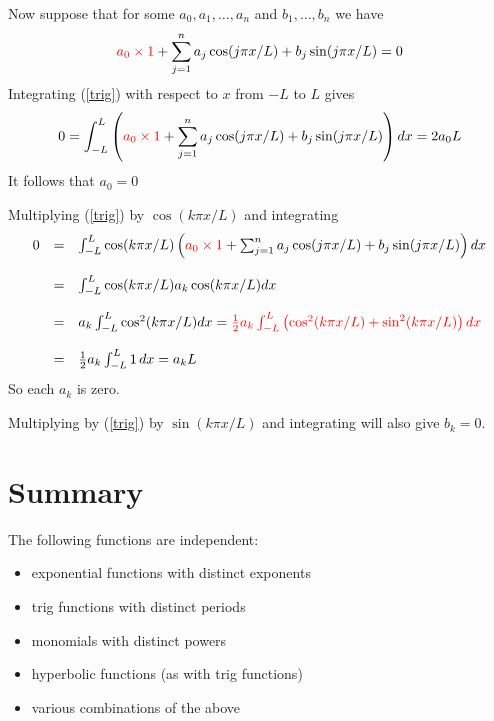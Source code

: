 \documentclass{article}
\begin{document}
Now suppose that for some $a_0, a_1, \ldots , a_n$ and $b_1, \dots , b_n$ we have
\begin{equation}
\label{trig}
\textcolor{red}{a_0 \times 1} + \sum_{j = 1}^n a_j \cos (j \pi x/L) + b_j \sin (j \pi x/L) = 0
\end{equation}
Integrating (\ref{trig}) with respect to $x$ from $-L$ to $L$ gives
$$
0 = \int_{-L}^L \left( \textcolor{red}{a_0 \times 1} + \sum_{j = 1}^n a_j \cos (j \pi x/L) + b_j \sin (j \pi x/L) \right) dx = 2 a_0 L
$$
It follows that $a_0 = 0$


Multiplying (\ref{trig}) by $\cos (k \pi x/L)$ and integrating
{\small
$$
\begin{array}{lll}
0 & = & \int_{-L}^L \cos (k \pi x/L) \left( \textcolor{red}{a_0 \times 1} + \sum_{j = 1}^n a_j \cos (j \pi x/L) + b_j \sin (j \pi x/L) \right) dx\\
\\
& = & \int_{-L}^L \cos (k \pi x/L)  a_k \cos (k \pi x/L) dx \\
\\
& = &  a_k \int_{-L}^L \cos ^2(k \pi x/L) dx = \textcolor{red}{\frac{1}{2}  a_k \int_{-L}^L \left( \cos^2 (k \pi x/L)  + \sin^2 (k \pi x/L) \right) dx} \\
\\
& = & \frac{1}{2}  a_k \int_{-L}^L 1 \, dx = a_k L
\end{array}
$$
}
So each $a_k$ is zero. 

Multiplying by (\ref{trig}) by $\sin (k \pi x/L)$ and integrating will also give $b_k = 0$.

\section{Summary}

The following functions are independent:
\begin{itemize}
\item
exponential functions with distinct exponents
\item
trig functions with distinct periods
\item
monomials with distinct powers
\item
hyperbolic functions (as with trig functions)
\item
various combinations of the above
\end{itemize}
\end{document}
